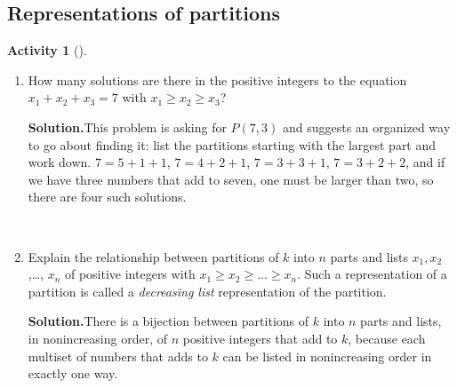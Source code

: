 \documentclass[10pt,]{book}
\theoremstyle{plain}
\theoremstyle{definition}
\newtheorem{activity}[project]{Activity}
\numberwithin{equation}{chapter}
\begin{document}
\subsection[{Representations of partitions}]{Representations of partitions}\label{subsection-14}
\begin{activity}[]\label{activity-50}
~\par
\begin{enumerate}[label=(\alph*)]
 \item How many solutions are there in the positive integers to the equation \(x_1+x_2+x_3 =7\) with \(x_1\ge x_2\ge x_3\)?%
\par\medskip\noindent%
\textbf{Solution.}\quad This problem is asking for \(P(7,3)\) and suggests an organized way to go about finding it: list the partitions starting with the largest part and work down. \(7=5+1+1\), \(7=4+2+1\), \(7=3+3+1\), \(7=3+2+2\), and if we have three numbers that add to seven, one must be larger than two, so there are four such solutions.%

~\par
\item Explain the relationship between partitions of \(k\) into \(n\) parts and lists \(x_1,x_2\),\dots{}, \(x_n\) of positive integers with \(x_1\ge x_2\ge\ldots
\ge x_n\). Such a representation of a partition is called a \emph{decreasing list} representation of the partition.%
\par\medskip\noindent%
\textbf{Solution.}\quad There is a bijection between partitions of \(k\) into \(n\) parts and lists, in nonincreasing order, of \(n\) positive integers that add to \(k\), because each multiset of numbers that adds to \(k\) can be listed in nonincreasing order in exactly one way.%

\end{enumerate}
\end{activity}
\end{document}
